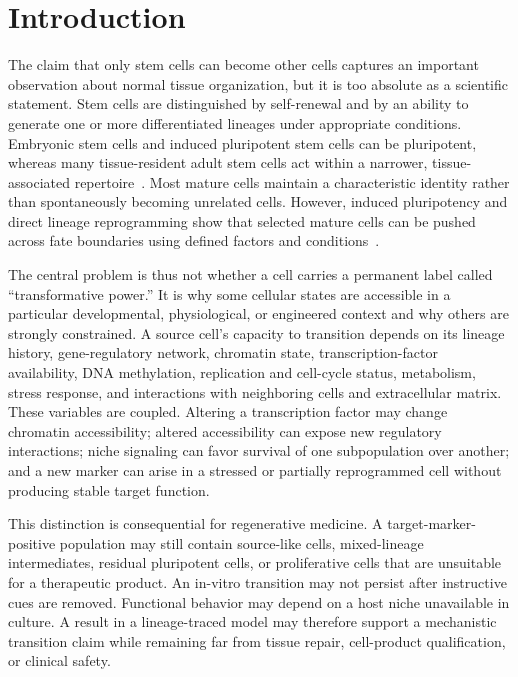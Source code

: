 \documentclass[10pt,conference]{IEEEtran}
\begin{document}
\section{Introduction}
\label{sec:introduction}

The claim that only stem cells can become other cells captures an important observation about normal tissue organization, but it is too absolute as a scientific statement. Stem cells are distinguished by self-renewal and by an ability to generate one or more differentiated lineages under appropriate conditions. Embryonic stem cells and induced pluripotent stem cells can be pluripotent, whereas many tissue-resident adult stem cells act within a narrower, tissue-associated repertoire~\cite{nihstem}. Most mature cells maintain a characteristic identity rather than spontaneously becoming unrelated cells. However, induced pluripotency and direct lineage reprogramming show that selected mature cells can be pushed across fate boundaries using defined factors and conditions~\cite{takahashi2006,yu2007,graf2009}.

The central problem is thus not whether a cell carries a permanent label called ``transformative power.'' It is why some cellular states are accessible in a particular developmental, physiological, or engineered context and why others are strongly constrained. A source cell's capacity to transition depends on its lineage history, gene-regulatory network, chromatin state, transcription-factor availability, DNA methylation, replication and cell-cycle status, metabolism, stress response, and interactions with neighboring cells and extracellular matrix. These variables are coupled. Altering a transcription factor may change chromatin accessibility; altered accessibility can expose new regulatory interactions; niche signaling can favor survival of one subpopulation over another; and a new marker can arise in a stressed or partially reprogrammed cell without producing stable target function.

This distinction is consequential for regenerative medicine. A target-marker-positive population may still contain source-like cells, mixed-lineage intermediates, residual pluripotent cells, or proliferative cells that are unsuitable for a therapeutic product. An in-vitro transition may not persist after instructive cues are removed. Functional behavior may depend on a host niche unavailable in culture. A result in a lineage-traced model may therefore support a mechanistic transition claim while remaining far from tissue repair, cell-product qualification, or clinical safety.
\end{document}
